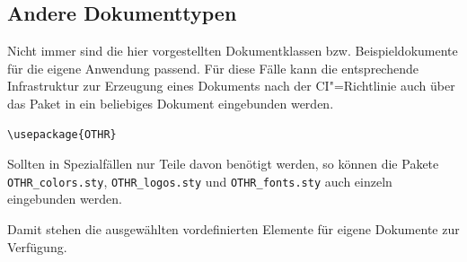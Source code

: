 \subsection{Andere Dokumenttypen}

Nicht immer sind die hier vorgestellten Dokumentklassen bzw. Beispieldokumente für die eigene Anwendung passend.
Für diese Fälle kann die entsprechende Infrastruktur zur Erzeugung eines Dokuments nach der CI"=Richtlinie auch über das Paket  in ein beliebiges Dokument eingebunden werden.

\begin{verbatim}
\usepackage{OTHR}
\end{verbatim}

Sollten in Spezialfällen nur Teile davon benötigt werden, so können die Pakete \texttt{OTHR\_colors.sty}, \texttt{OTHR\_logos.sty} und \texttt{OTHR\_fonts.sty} auch einzeln eingebunden werden.

Damit stehen die ausgewählten vordefinierten Elemente für eigene Dokumente zur Verfügung.

